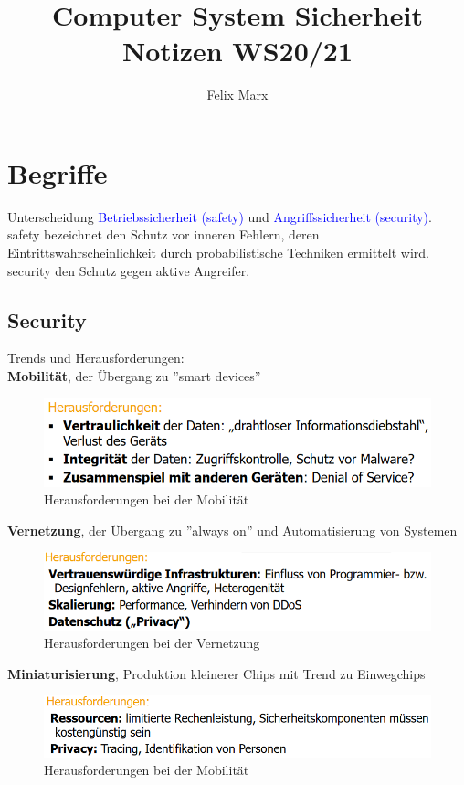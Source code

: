 \documentclass[a4paper,12pt]{article}
\title{Computer System Sicherheit\\Notizen WS20/21}
\author{Felix Marx}
\newcommand{\blue}[1]{\textcolor{blue}{#1}}
\begin{document}
\maketitle

{
\hypersetup{linkcolor=black}
\tableofcontents
}
\newpage

\section{Begriffe}
Unterscheidung \blue{Betriebssicherheit (safety)} und \blue{Angriffssicherheit (security)}.\\
safety bezeichnet den Schutz vor inneren Fehlern, deren Eintrittswahrscheinlichkeit durch probabilistische Techniken ermittelt wird.\\
security den Schutz gegen aktive Angreifer.

\subsection{Security}

Trends und Herausforderungen:\\
\textbf{Mobilität}, der Übergang zu ''smart devices''
\begin{figure}[h!]
\centering
\includegraphics[scale=0.6]{Grafiken/Trend-Mobilitaet.png}
\caption{Herausforderungen bei der Mobilität}
\end{figure}

\textbf{Vernetzung}, der Übergang zu ''always on'' und Automatisierung von Systemen
\begin{figure}[h!]
\centering
\includegraphics[scale=0.6]{Grafiken/Trend-Vernetzung.png}
\caption{Herausforderungen bei der Vernetzung}
\end{figure}

\textbf{Miniaturisierung}, Produktion kleinerer Chips mit Trend zu Einwegchips
\begin{figure}[h!]
\centering
\includegraphics[scale=0.6]{Grafiken/Trend-Miniaturisierung.png}
\caption{Herausforderungen bei der Mobilität}
\end{figure}\\
\end{document}
